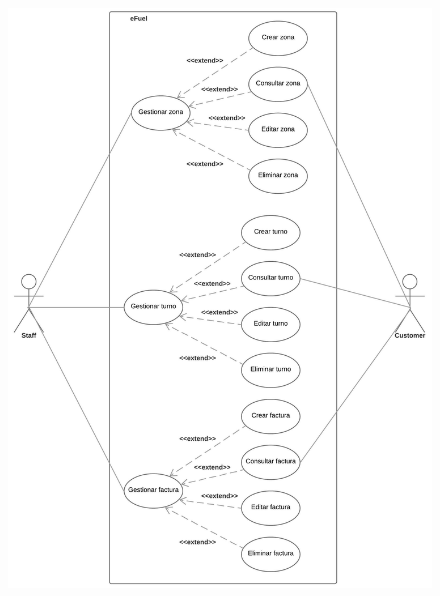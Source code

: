 \documentclass{article}
\begin{document}
    \begin{figure}[H]
        \includegraphics[width=\textwidth]{cu2.jpeg}
        \centering
    \end{figure}
\end{document}
